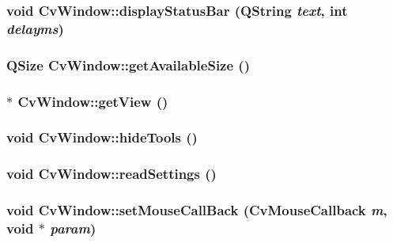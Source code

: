 \label{classCvWindow_a577841174681451e47735cc125de0af9}
\hypertarget{classCvWindow_a37a9d43cf4e722abbb32a20fc507c8a9}{
\subsubsection[{displayStatusBar}]{\setlength{\rightskip}{0pt plus 5cm}void CvWindow::displayStatusBar (QString {\em text}, \/  int {\em delayms})}}
\label{classCvWindow_a37a9d43cf4e722abbb32a20fc507c8a9}
\hypertarget{classCvWindow_a323bcaa31cfe862e2b13a110248293cc}{
\subsubsection[{getAvailableSize}]{\setlength{\rightskip}{0pt plus 5cm}QSize CvWindow::getAvailableSize ()}}
\label{classCvWindow_a323bcaa31cfe862e2b13a110248293cc}
\hypertarget{classCvWindow_a6bfa17ceb41e3fad856b9dd32d25e048}{
\subsubsection[{getView}]{ $\ast$ CvWindow::getView ()}}
\label{classCvWindow_a6bfa17ceb41e3fad856b9dd32d25e048}
\hypertarget{classCvWindow_a40da445af152145b663ebdc5a2547351}{
\subsubsection[{hideTools}]{\setlength{\rightskip}{0pt plus 5cm}void CvWindow::hideTools ()}}
\label{classCvWindow_a40da445af152145b663ebdc5a2547351}
\hypertarget{classCvWindow_a7f8fdaeec81ca1900a8878bdfc779f13}{
\subsubsection[{readSettings}]{\setlength{\rightskip}{0pt plus 5cm}void CvWindow::readSettings ()}}
\label{classCvWindow_a7f8fdaeec81ca1900a8878bdfc779f13}
\hypertarget{classCvWindow_a8fa9463b57ffb2f049703a6f14e586fb}{
\subsubsection[{setMouseCallBack}]{\setlength{\rightskip}{0pt plus 5cm}void CvWindow::setMouseCallBack (CvMouseCallback {\em m}, \/  void $\ast$ {\em param})}}
